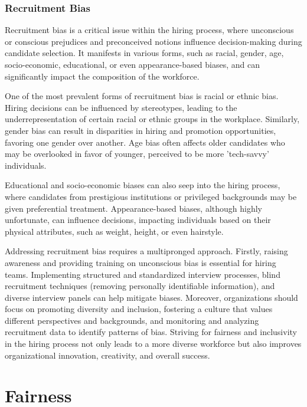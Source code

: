 \documentclass[12pt,a4paper,openright,twoside]{book}
\begin{document}
\subsubsection{Recruitment Bias}

Recruitment bias is a critical issue within the hiring process, where unconscious or conscious prejudices and preconceived notions influence decision-making during candidate selection. It manifests in various forms, such as racial, gender, age, socio-economic, educational, or even appearance-based biases, and can significantly impact the composition of the workforce. \cite{mujtaba2019ethical} 

One of the most prevalent forms of recruitment bias is racial or ethnic bias. Hiring decisions can be influenced by stereotypes, leading to the underrepresentation of certain racial or ethnic groups in the workplace. Similarly, gender bias can result in disparities in hiring and promotion opportunities, favoring one gender over another. Age bias often affects older candidates who may be overlooked in favor of younger, perceived to be more 'tech-savvy' individuals. 

Educational and socio-economic biases can also seep into the hiring process, where candidates from prestigious institutions or privileged backgrounds may be given preferential treatment. Appearance-based biases, although highly unfortunate, can influence decisions, impacting individuals based on their physical attributes, such as weight, height, or even hairstyle. 

Addressing recruitment bias requires a multipronged approach. Firstly, raising awareness and providing training on unconscious bias is essential for hiring teams. Implementing structured and standardized interview processes, blind recruitment techniques (removing personally identifiable information), and diverse interview panels can help mitigate biases. Moreover, organizations should focus on promoting diversity and inclusion, fostering a culture that values different perspectives and backgrounds, and monitoring and analyzing recruitment data to identify patterns of bias. Striving for fairness and inclusivity in the hiring process not only leads to a more diverse workforce but also improves organizational innovation, creativity, and overall success.

\newpage
\section{Fairness} 
\end{document}
